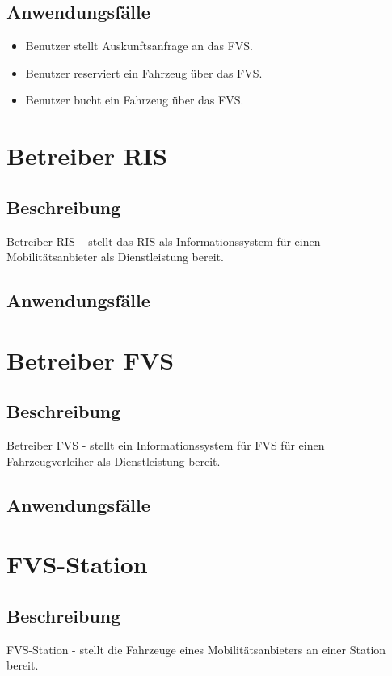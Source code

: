 \subsection{Anwendungsfälle}
\begin{itemize}
\item Benutzer stellt Auskunftsanfrage an das FVS.
\item Benutzer reserviert ein Fahrzeug über das FVS.
\item Benutzer bucht ein Fahrzeug über das FVS.
\end{itemize}

\section{Betreiber RIS}

\subsection{Beschreibung}
Betreiber RIS – stellt das RIS als Informationssystem für einen Mobilitätsanbieter als Dienstleistung bereit.

\subsection{Anwendungsfälle}

\section{Betreiber FVS}
\subsection{Beschreibung}
Betreiber FVS - stellt ein Informationssystem für FVS für einen Fahrzeugverleiher als Dienstleistung bereit.

\subsection{Anwendungsfälle}

\section{FVS-Station}

\subsection{Beschreibung}
FVS-Station - stellt die Fahrzeuge eines Mobilitätsanbieters an einer Station bereit.

